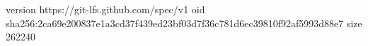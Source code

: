 version https://git-lfs.github.com/spec/v1
oid sha256:2ca69e200837e1a3cd37f439ed23bf03d7f36c781d6ec39810f92af5993d88e7
size 262240
